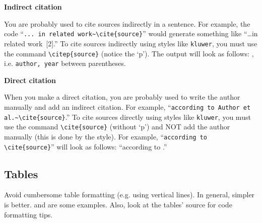\vspace{0.5cm}
\noindent
\textbf{Indirect citation}

You are probably used to cite sources indirectly in a sentence.
For example, the code ``\verb|... in related work~\cite{source}|''
would generate something like ``\dots in related work~[2].''
To cite sources indirectly using styles like \texttt{kluwer},
you must use the command \verb|\citep{source}| (notice the `p').
The output will look as follows: \citep{spinellis:latexadvice},
i.e. \texttt{author, year} between parentheses.

\vspace{0.5cm}
\noindent
\textbf{Direct citation}

When you make a direct citation, you are probably used to write
the author manually and add an indirect citation. For example,
``\texttt{according to Author et} \verb|al.~\cite{source}|.''
To cite sources directly using styles like \texttt{kluwer},
you must use the command \verb|\cite{source}| (without `p')
and NOT add the author manually (this is done by the style).
For example, ``\verb|according to \cite{source}|''
will look as follows: ``according to \cite{spinellis:latexadvice}.''

\subsection{Tables}
\label{sec:c1:latex_tables}

Avoid cumbersome table formatting (e.g. using vertical lines).
In general, simpler is better.
 and  are some examples.
Also, look at the tables' source for code formatting tips.


